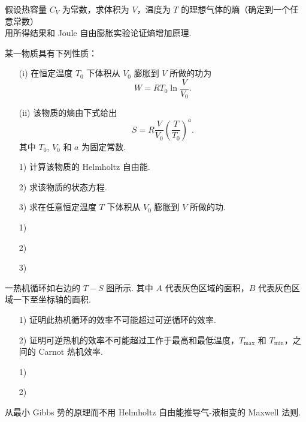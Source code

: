 \documentclass{assignment}
\begin{document}
\begin{prob}
    假设热容量 $C_V$ 为常数，求体积为 $V$，温度为 $T$ 的理想气体的熵（确定到一个任意常数）\\
    用所得结果和 Joule 自由膨胀实验论证熵增加原理.
\end{prob}
\begin{sol}
    
\end{sol}

\begin{prob}
    某一物质具有下列性质：
    \begin{itemize}
        \item[(i)] 在恒定温度 $T_0$ 下体积从 $V_0$ 膨胀到 $V$ 所做的功为
        \[
            W=RT_0\ln\frac{V}{V_0}.
        \]
        \item[(ii)] 该物质的熵由下式给出
        \[
            S=R\frac{V}{V_0}\left(\frac{T}{T_0}\right)^a.
        \]
        其中 $T_0$, $V_0$ 和 $a$ 为固定常数.
    \end{itemize}
    \begin{itemize}
        \item[1)] 计算该物质的 Helmholtz 自由能.
        \item[2)] 求该物质的状态方程.
        \item[3)] 求在任意恒定温度 $T$ 下体积从 $V_0$ 膨胀到 $V$ 所做的功.
    \end{itemize}
\end{prob}
\begin{sol}
    \begin{itemize}
        \item[1)] 
        \item[2)] 
        \item[3)] 
    \end{itemize}
\end{sol}

\begin{prob}
    一热机循环如右边的 $T-S$ 图所示. 其中 $A$ 代表灰色区域的面积，$B$ 代表灰色区域一下至坐标轴的面积.
    \begin{itemize}
        \item[1)] 证明此热机循环的效率不可能超过可逆循环的效率.
        \item[2)] 证明可逆热机的效率不可能超过工作于最高和最低温度，$T_{\max}$ 和 $T_{\min}$，之间的 Carnot 热机效率.
    \end{itemize}
\end{prob}
\begin{pf}
    \begin{itemize}
        \item[1)] 
        \item[2)] 
    \end{itemize}
\end{pf}

\begin{prob}
    从最小 Gibbs 势的原理而不用 Helmholtz 自由能推导气-液相变的 Maxwell 法则.
\end{prob}
\begin{pf}
    
\end{pf}
\end{document}
